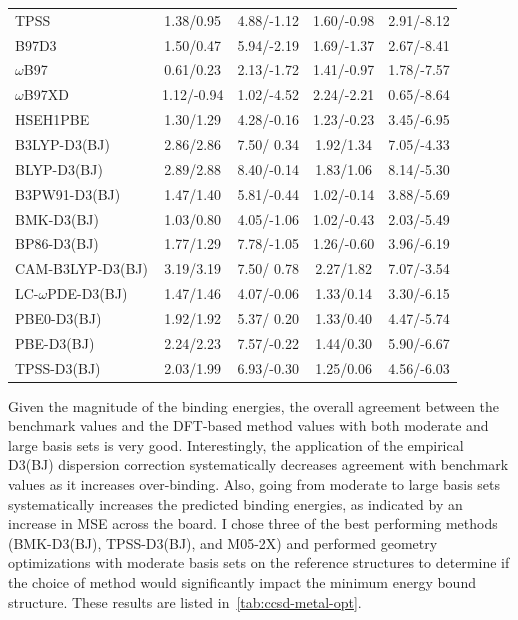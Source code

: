 \begin{longtable}[!htbp]{m{4cm} c c | c c}
TPSS\cite{Tao2003}   &  1.38/0.95 &  4.88/-1.12  &  1.60/-0.98 &  2.91/-8.12 \\
B97\cite{Becke1997}D3\cite{Grimme2010} &  1.50/0.47 &  5.94/-2.19  &  1.69/-1.37 &  2.67/-8.41 \\
$\omega$B97\cite{Chai2008a} &  0.61/0.23 &  2.13/-1.72  &  1.41/-0.97 &  1.78/-7.57 \\
$\omega$B97XD\cite{Chai2008} &  1.12/-0.94 &  1.02/-4.52  &  2.24/-2.21 &  0.65/-8.64 \\
HSEH1PBE\cite{Heyd2004, Heyd2005} &  1.30/1.29 &  4.28/-0.16  &  1.23/-0.23 &  3.45/-6.95 \\
B3LYP-D3(BJ)\cite{Grimme2010, Johnson2006} &  2.86/2.86 &  7.50/ 0.34  &  1.92/1.34 &  7.05/-4.33 \\
BLYP-D3(BJ)       &  2.89/2.88 &  8.40/-0.14  &  1.83/1.06 &  8.14/-5.30 \\
B3PW91-D3(BJ)     &  1.47/1.40 &  5.81/-0.44  &  1.02/-0.14 &  3.88/-5.69 \\
BMK-D3(BJ)        &  1.03/0.80 &  4.05/-1.06  &  1.02/-0.43 &  2.03/-5.49 \\
BP86-D3(BJ)       &  1.77/1.29 &  7.78/-1.05  &  1.26/-0.60 &  3.96/-6.19 \\
CAM-B3LYP-D3(BJ)  &  3.19/3.19 &  7.50/ 0.78  &  2.27/1.82 &  7.07/-3.54 \\
LC-$\omega$PDE-D3(BJ)& 1.47/1.46 & 4.07/-0.06 &  1.33/0.14 &  3.30/-6.15 \\
PBE0-D3(BJ)       &  1.92/1.92 &  5.37/ 0.20  &  1.33/0.40 &  4.47/-5.74 \\
PBE-D3(BJ)        &  2.24/2.23 &  7.57/-0.22  &  1.44/0.30 &  5.90/-6.67 \\
TPSS-D3(BJ)       &  2.03/1.99 &  6.93/-0.30  &  1.25/0.06 &  4.56/-6.03
\end{longtable}
\setlength\LTleft{0pt}
\setlength\LTright{0pt}

Given the magnitude of the binding energies, the overall agreement between the
benchmark values and the DFT-based method values with both moderate and large
basis sets is very good. Interestingly, the application of the empirical D3(BJ)
dispersion correction systematically decreases agreement with benchmark values
as it increases over-binding. Also, going from moderate to large basis sets
systematically increases the predicted binding energies, as indicated by an
increase in MSE across the board. I chose three of the best performing methods
(BMK-D3(BJ), TPSS-D3(BJ), and M05-2X) and performed geometry optimizations with
moderate basis sets on the reference structures to determine if the choice of
method would significantly impact the minimum energy bound structure. These
results are listed in~\ref{tab:ccsd-metal-opt}.

